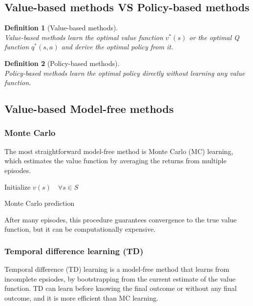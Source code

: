 \documentclass[11pt]{book} %
\newtheorem{definition}{Definition}[section]
\begin{document}
\subsection{Value-based methods VS Policy-based methods}
\begin{definition}[Value-based methods]\ \\
    Value-based methods learn the optimal value function $v^*(s)$ or the optimal Q function $q^*(s, a)$ and derive the optimal policy from it.
\end{definition}

\begin{definition}[Policy-based methods]\ \\
    Policy-based methods learn the optimal policy directly without learning any value function.
\end{definition}


\subsection{Value-based Model-free methods}


\subsubsection{Monte Carlo}
The most straightforward model-free method is Monte Carlo (MC) learning, which estimates the value function by averaging the returns from multiple episodes.

\begin{algorithm}[H] 
    \SetAlgoLined
    Initialize $v(s) \quad \forall s \in S$ \\
    \caption{Monte Carlo prediction\label{Monte Carlo prediction}}
\end{algorithm}
After many episodes, this procedure guarantees convergence to the true value function, but it can be computationally expensive.

\subsubsection{Temporal difference learning (TD)}
Temporal difference (TD) learning is a model-free method that learns from incomplete epsiodes, by bootstrapping from the current estimate of the value function.
TD can learn before knowing the final outcome or without any final outcome, and it is more efficient than MC learning.
\end{document}
